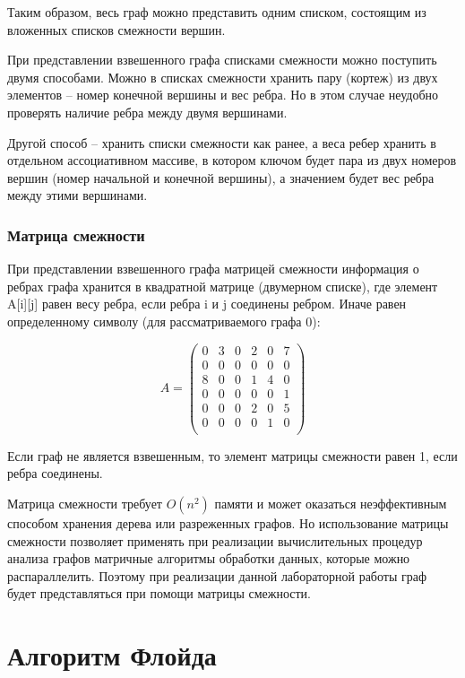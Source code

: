 Таким образом, весь граф можно представить одним списком, состоящим из вложенных списков смежности вершин.

При представлении взвешенного графа списками смежности можно поступить двумя способами. Можно в списках смежности хранить пару (кортеж) из двух элементов -- номер конечной вершины и вес ребра. Но в этом случае неудобно проверять наличие ребра между двумя вершинами.

Другой способ -- хранить списки смежности как ранее, а веса ребер хранить в отдельном ассоциативном массиве, в котором ключом будет пара из двух номеров вершин (номер начальной и конечной вершины), а значением будет вес ребра между этими вершинами.

\subsubsection{Матрица смежности}

При представлении взвешенного графа матрицей смежности информация о ребрах графа хранится в квадратной матрице (двумерном списке), где элемент A[i][j] равен весу ребра, если ребра i и j соединены ребром.  Иначе равен определенному символу (для рассматриваемого графа 0):

\begin{equation}
	A = \begin{pmatrix}
		0 & 3 & 0 & 2 & 0 & 7\\
		0 & 0 & 0 & 0 & 0 & 0\\
		8 & 0 & 0 & 1 & 4 & 0\\
		0 & 0 & 0 & 0 & 0 & 1\\
		0 & 0 & 0 & 2 & 0 & 5\\
		0 & 0 & 0 & 0 & 1 & 0\\
	\end{pmatrix}
\end{equation}

Если граф не является взвешенным, то элемент матрицы смежности равен 1, если ребра соединены.

Матрица смежности требует $O(n^2)$ памяти и может оказаться неэффективным способом хранения дерева или разреженных графов. Но использование матрицы смежности позволяет применять при реализации вычислительных процедур анализа графов матричные алгоритмы обработки данных, которые можно распараллелить. Поэтому при реализации данной лабораторной работы граф будет представляться при помощи матрицы смежности.

\section{Алгоритм Флойда}

